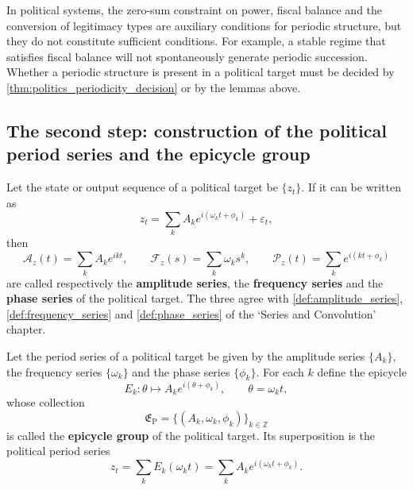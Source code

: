\begin{remark}\label{rem:politics_invariant_not_period}
In political systems, the zero-sum constraint on power, fiscal balance and the conversion of legitimacy types are auxiliary conditions for periodic structure, but they do not constitute sufficient conditions. For example, a stable regime that satisfies fiscal balance will not spontaneously generate periodic succession. Whether a periodic structure is present in a political target must be decided by \cref{thm:politics_periodicity_decision} or by the lemmas above.
\end{remark}

\subsection{The second step: construction of the political period series and the epicycle group}

\begin{definition}\label{def:politics_series}
Let the state or output sequence of a political target be $\{z_t\}$. If it can be written as
\[
z_t=\sum_k A_k e^{i(\omega_k t+\phi_k)}+\varepsilon_t,
\]
then
\[
\mathcal A_z(t)=\sum_k A_k e^{ikt},\qquad
\mathcal F_z(s)=\sum_k \omega_k s^k,\qquad
\mathcal P_z(t)=\sum_k e^{i(kt+\phi_k)}
\]
are called respectively the \textbf{amplitude series}, the \textbf{frequency series} and the \textbf{phase series} of the political target. The three agree with \cref{def:amplitude_series}, \cref{def:frequency_series} and \cref{def:phase_series} of the `Series and Convolution' chapter.
\end{definition}

\begin{definition}\label{def:politics_epicycle_group}
Let the period series of a political target be given by the amplitude series $\{A_k\}$, the frequency series $\{\omega_k\}$ and the phase series $\{\phi_k\}$. For each $k$ define the epicycle
\[
E_k:\theta\mapsto A_k e^{i(\theta+\phi_k)},\qquad \theta=\omega_k t,
\]
whose collection
\[
\mathfrak E_{\mathrm{P}}=\{(A_k,\omega_k,\phi_k)\}_{k\in\mathbb Z}
\]
is called the \textbf{epicycle group} of the political target. Its superposition is the political period series
\[
z_t=\sum_k E_k(\omega_k t)=\sum_k A_k e^{i(\omega_k t+\phi_k)}.
\]
\end{definition}

